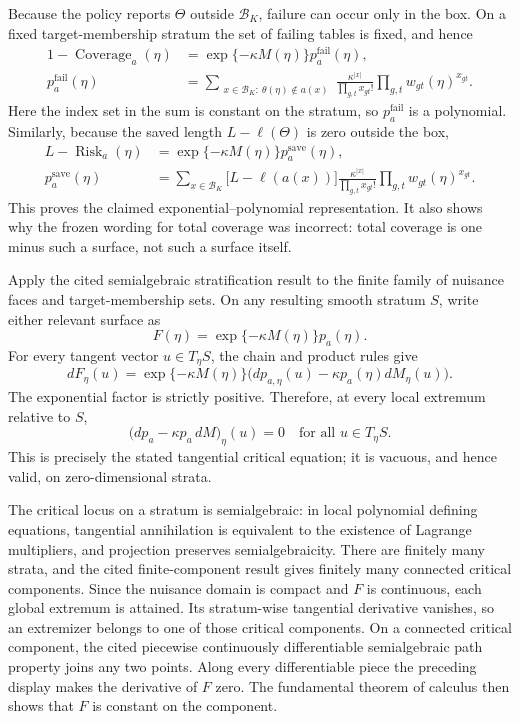 Because the policy reports \(\Theta\) outside \(\mathcal B_K\), failure can occur only in the box.  On a fixed target-membership stratum the set of failing tables is fixed, and hence
\[
 \begin{split}
 1-\operatorname{Coverage}_a(\eta)
 &=\exp\{-\kappa M(\eta)\}p_a^{\mathrm{fail}}(\eta),\\
 p_a^{\mathrm{fail}}(\eta)
 &=\sum_{\substack{x\in\mathcal B_K:\
             \theta(\eta)\notin a(x)}}
   \frac{\kappa^{|x|}}{\prod_{g,t}x_{gt}!}
   \prod_{g,t}w_{gt}(\eta)^{x_{gt}}.
 \end{split}
\]
Here the index set in the sum is constant on the stratum, so \(p_a^{\mathrm{fail}}\) is a polynomial.  Similarly, because the saved length \(L-\ell(\Theta)\) is zero outside the box,
\[
 \begin{split}
 L-\operatorname{Risk}_a(\eta)
 &=\exp\{-\kappa M(\eta)\}p_a^{\mathrm{save}}(\eta),\\
 p_a^{\mathrm{save}}(\eta)
 &=\sum_{x\in\mathcal B_K}
   \bigl[L-\ell(a(x))\bigr]
   \frac{\kappa^{|x|}}{\prod_{g,t}x_{gt}!}
   \prod_{g,t}w_{gt}(\eta)^{x_{gt}}.
 \end{split}
\]
This proves the claimed exponential--polynomial representation.  It also shows why the frozen wording for total coverage was incorrect: total coverage is one minus such a surface, not such a surface itself.

Apply the cited semialgebraic stratification result to the finite family of nuisance faces and target-membership sets.  On any resulting smooth stratum \(S\), write either relevant surface as
\[
 F(\eta)=\exp\{-\kappa M(\eta)\}p_a(\eta).
\]
For every tangent vector \(u\in T_\eta S\), the chain and product rules give
\[
 dF_\eta(u)
 =\exp\{-\kappa M(\eta)\}
   \bigl(dp_{a,\eta}(u)-\kappa p_a(\eta)dM_\eta(u)\bigr).
\]
The exponential factor is strictly positive.  Therefore, at every local extremum relative to \(S\),
\[
 \bigl(dp_a-\kappa p_a\,dM\bigr)_\eta(u)=0
 \quad\text{for all }u\in T_\eta S.
\]
This is precisely the stated tangential critical equation; it is vacuous, and hence valid, on zero-dimensional strata.

The critical locus on a stratum is semialgebraic: in local polynomial defining equations, tangential annihilation is equivalent to the existence of Lagrange multipliers, and projection preserves semialgebraicity.  There are finitely many strata, and the cited finite-component result gives finitely many connected critical components.  Since the nuisance domain is compact and \(F\) is continuous, each global extremum is attained.  Its stratum-wise tangential derivative vanishes, so an extremizer belongs to one of those critical components.  On a connected critical component, the cited piecewise continuously differentiable semialgebraic path property joins any two points.  Along every differentiable piece the preceding display makes the derivative of \(F\) zero.  The fundamental theorem of calculus then shows that \(F\) is constant on the component.

